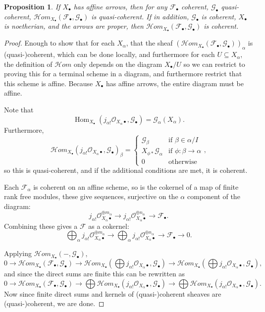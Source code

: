 \documentclass[proquest]{uwthesis}[2014/11/13]
\newtheorem{prop}[theorem]{Proposition}
\theoremstyle{definition}
\DeclareMathOperator{\Hom}{Hom}
\newcommand{\cHom}{\mathcal{H} \textit{om}}
\newcommand{\FF}{\mathscr{F}}
\newcommand{\GG}{\mathscr{G}}
\newcommand{\OO}{\mathcal{O}}
\begin{document}
\begin{prop}
	\label{prp:homqcaffine}
	If $X_\bullet$ has affine arrows, then for any $\FF_\bullet$ coherent, $\GG_\bullet$ quasi-coherent, $\cHom_{X_\bullet}(\FF_\bullet, \GG_\bullet)$ is quasi-coherent.
	If in addition, $\GG_\bullet$ is coherent, $X_\bullet$ is noetherian, and the arrows are proper, then $\cHom_{X_\bullet}(\FF_\bullet, \GG_\bullet)$ is coherent.
\end{prop}
\begin{proof}
	Enough to show that for each $X_\alpha$, that the sheaf $(\cHom_{X_\bullet}(\FF_\bullet, \GG_\bullet))_\alpha$ is (quasi-)coherent, which can be done locally, and furthermore for each $U \subseteq X_\alpha$, the definition of $\cHom$ only depends on the diagram $X_\bullet / U$ so we can restrict to proving this for a terminal scheme in a diagram, and furthermore restrict that this scheme is affine.
	Because $X_\bullet$ has affine arrows, the entire diagram must be affine.
		
	Note that
	\[
		\Hom_{X_\bullet}(j_{\alpha !} \OO_{X_\alpha \bullet}, \GG_\bullet) = \GG_\alpha(X_\alpha).
	\]
	Furthermore,
	\[
		\cHom_{X_\bullet}(j_{\alpha !} \OO_{X_\alpha \bullet}, \GG_\bullet)_\beta = \begin{cases}
													\GG_\beta  & \text{if } \beta \in \alpha / I \\
													X_{\phi *} \GG_\alpha & \text{if } \phi : \beta \rightarrow \alpha \\
													0 & \text{otherwise}
													\end{cases},
	\]
	so this is quasi-coherent, and if the additional conditions are met, it is coherent.
	
	Each $\FF_\alpha$ is coherent on an affine scheme, so is the cokernel of a map of finite rank free modules, these give sequences, surjective on the $\alpha$ component of the diagram:
	\[
		j_{\alpha !}\OO_{X_\alpha \bullet}^{\oplus m_\alpha} \rightarrow j_{\alpha !}\OO_{X_\alpha \bullet}^{\oplus n_\alpha} \rightarrow \FF_\bullet.
	\]
	Combining these gives a $\FF$ as a cokernel:
	\[
		\bigoplus_\alpha j_{\alpha !}\OO_{X_\alpha \bullet}^{\oplus m_\alpha} \rightarrow \bigoplus_\alpha j_{\alpha !}\OO_{X_\alpha \bullet}^{ \oplus n_\alpha} \rightarrow \FF_\bullet \rightarrow 0.
	\]
	
	Applying $\cHom_{X_\bullet}(-,\GG_\bullet)$,
	\[
		0 \rightarrow \cHom_{X_\bullet}(\FF_\bullet, \GG_\bullet) \rightarrow \cHom_{X_\bullet}(\bigoplus j_{\alpha !}\OO_{X_\alpha \bullet}, \GG_\bullet) \rightarrow \cHom_{X_\bullet}(\bigoplus j_{\alpha !}\OO_{X_\alpha \bullet}, \GG_\bullet),
	\]
	and since the direct sums are finite this can be rewritten as
	\[
		0 \rightarrow \cHom_{X_\bullet}(\FF_\bullet, \GG_\bullet) \rightarrow \bigoplus \cHom_{X_\bullet}(j_{\alpha !}\OO_{X_\alpha \bullet}, \GG_\bullet) \rightarrow \bigoplus \cHom_{X_\bullet}(j_{\alpha !}\OO_{X_\alpha \bullet}, \GG_\bullet).
	\]
	Now since finite direct sums and kernels of (quasi-)coherent sheaves are (quasi-)coherent, we are done.
\end{proof}
\end{document}
